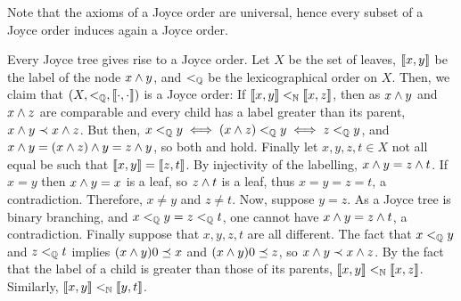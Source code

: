 Note that the axioms of a Joyce order are universal, hence every subset of a Joyce order induces again a Joyce order.



Every Joyce tree gives rise to a Joyce order. Let $X$ be the set of leaves, $\llbracket x , y \rrbracket$ be the label of the node $x \wedge y$, and $<_{\mathbb{Q}}$ be the lexicographical order on $X$. Then, we claim that $(X,<_{\mathbb{Q}},\llbracket \cdot , \cdot \rrbracket)$ is a Joyce order: If $\llbracket x , y \rrbracket<_{\mathbb{N}}\llbracket x , z \rrbracket$, then as $x\wedge y$ and $x\wedge z$ are comparable and every child has a label greater than its parent, $x\wedge y\prec x\wedge z$. But then, $x<_{\mathbb{Q}} y\iff (x\wedge z)<_{\mathbb{Q}} y\iff z<_{\mathbb{Q}} y$, and $x\wedge y = (x\wedge z)\wedge y=z\wedge y$, so both  and  hold. Finally let $x,y,z,t\in X$ not all equal be such that $\llbracket x , y \rrbracket=\llbracket z , t \rrbracket$. By injectivity of the labelling, $x\wedge y= z\wedge t$. If $x=y$ then $x\wedge y =x$ is a leaf, so $z\wedge t$ is a leaf, thus $x=y=z=t$, a contradiction. Therefore, $x\neq y$ and $z\neq t$. Now, suppose $y=z$. As a Joyce tree is binary branching, and $x<_{\mathbb{Q}} y=z<_{\mathbb{Q}} t$, one cannot have $x\wedge y=z\wedge t$, a contradiction. Finally suppose that $x,y,z,t$ are all different. The fact that $x<_{\mathbb{Q}} y$ and $z<_{\mathbb{Q}} t$ implies $(x\wedge y)0\preceq x$ and $(x\wedge y)0\preceq z$, so $x\wedge y\prec x\wedge z$. By the fact that the label of a child is greater than those of its parents, $\llbracket x , y \rrbracket<_{\mathbb{N}}\llbracket x , z \rrbracket$. Similarly, $\llbracket x , y \rrbracket<_{\mathbb{N}}\llbracket y , t \rrbracket$.  %


